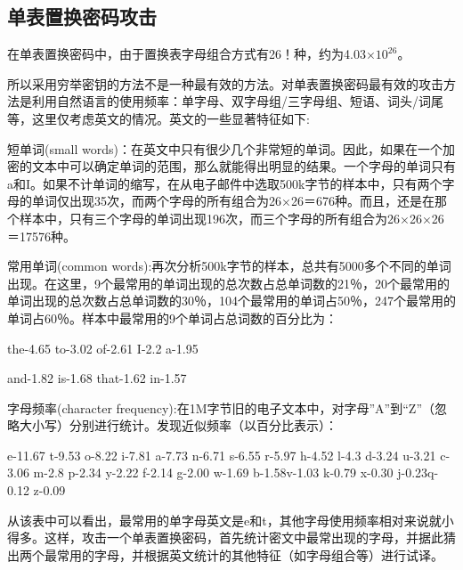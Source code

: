 \documentclass[UTF8,a4paper]{article}
\begin{document}
	\subsection{单表置换密码攻击}
	在单表置换密码中，由于置换表字母组合方式有26！种，约为4.03×$10^{26}$。\par 
	所以采用穷举密钥的方法不是一种最有效的方法。对单表置换密码最有效的攻击方法是利用自然语言的使用频率：单字母、双字母组/三字母组、短语、词头/词尾等，这里仅考虑英文的情况。英文的一些显著特征如下:\par 
	短单词(small words)：在英文中只有很少几个非常短的单词。因此，如果在一个加密的文本中可以确定单词的范围，那么就能得出明显的结果。一个字母的单词只有a和I。如果不计单词的缩写，在从电子邮件中选取500k字节的样本中，只有两个字母的单词仅出现35次，而两个字母的所有组合为26×26＝676种。而且，还是在那个样本中，只有三个字母的单词出现196次，而三个字母的所有组合为26×26×26＝17576种。\par 
	常用单词(common words):再次分析500k字节的样本，总共有5000多个不同的单词出现。在这里，9个最常用的单词出现的总次数占总单词数的21％，20个最常用的单词出现的总次数占总单词数的30％，104个最常用的单词占50％，247个最常用的单词占60％。样本中最常用的9个单词占总词数的百分比为：\par 
	\begin{center}
	the-4.65   \qquad   to-3.02   \qquad  of-2.61 \qquad   I-2.2   \qquad a-1.95\qquad \par 
	and-1.82    \qquad  is-1.68  \qquad   that-1.62 \qquad   in-1.57
\end{center}\par 
	字母频率(character frequency):在1M字节旧的电子文本中，对字母”A”到“Z”（忽略大小写）分别进行统计。发现近似频率（以百分比表示）：\par 
		\begin{center}
	e-11.67  \qquad  t-9.53  \qquad  o-8.22 \qquad   i-7.81 \qquad    a-7.73  \qquad  n-6.71 \qquad  s-6.55 
	r-5.97 \qquad    h-4.52  \qquad  l-4.3  \qquad   d-3.24  \qquad  u-3.21  \qquad  c-3.06  m-2.8
	p-2.34  \qquad   y-2.22 \qquad   f-2.14 \qquad   g-2.00 \qquad   w-1.69  \qquad  b-1.58\qquad   v-1.03
	k-0.79  \qquad   x-0.30   \qquad j-0.23\qquad    q-0.12  \qquad  z-0.09
\end{center}\par 
	从该表中可以看出，最常用的单字母英文是e和t，其他字母使用频率相对来说就小得多。这样，攻击一个单表置换密码，首先统计密文中最常出现的字母，并据此猜出两个最常用的字母，并根据英文统计的其他特征（如字母组合等）进行试译。\par 
	
\end{document}
